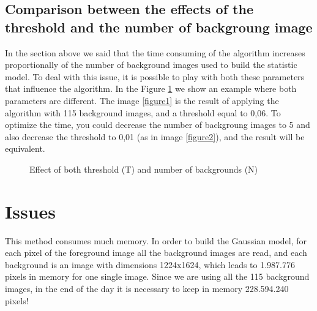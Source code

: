 \documentclass{article}
\begin{document}
\subsection{Comparison between the effects of the threshold and the number of backgroung image}
	In the section above we said that the time consuming of the algorithm increases proportionally of the number of background images used to build the statistic model. To deal with this issue, it is possible to play with both these parameters that influence the algorithm. In the Figure \ref{thresxback} we show an example where both parameters are different. The image \ref{figure1} is the result of applying the algorithm with 115 background images, and a threshold equal to 0,06. To optimize the time, you could decrease the number of backgroung images to 5 and also decrease the threshold to 0,01 (as in image \ref{figure2}), and the result will be equivalent.

	\begin{figure}[H]
		  \centering
		  \caption{Effect of both threshold (T) and number of backgrounds (N)}
		  \label{thresxback}
	\end{figure}
	
\section{Issues}
	This method consumes much memory. In order to build the Gaussian model, for each pixel of the foreground image all the background images are read, and each background is an image with dimensions 1224x1624, which leads to 1.987.776 pixels in memory for one single image. Since we are using all the 115 background images, in the end of the day it is necessary to keep in memory 228.594.240 pixels!
\end{document}
